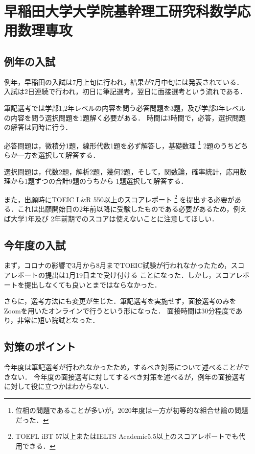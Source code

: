 \documentclass[uplatex]{jsarticle}
\begin{document}
\newpage	
\section*{早稲田大学大学院基幹理工研究科数学応用数理専攻}
\subsection*{例年の入試}
例年，早稲田の入試は7月上旬に行われ，結果が7月中旬には発表されている．
入試は2日連続で行われ，初日に筆記選考，翌日に面接選考という流れである．

筆記選考では学部1,2年レベルの内容を問う必答問題を3題，及び学部3年レベルの内容を問う選択問題を1題解く必要がある．
時間は3時間で，必答，選択問題の解答は同時に行う．

必答問題は，微積分1題，線形代数1題を必ず解答し，基礎数理
\footnote{ 位相の問題であることが多いが，2020年度は一方が初等的な組合せ論の問題だった．}
2題のうちどちらか一方を選択して解答する．

選択問題は，代数2題，解析2題，幾何2題，そして，関数論，確率統計，応用数理から1題ずつの合計9題のうちから
1題選択して解答する．

また，出願時にTOEIC L\&R 550以上のスコアレポート
\footnote{ TOEFL iBT 57以上またはIELTS Academic5.5以上のスコアレポートでも代用できる．}
を提出する必要がある．これは出願開始日の2年前以降に受験したものである必要があるため，例えば大学1年及び
2年前期でのスコアは使えないことに注意してほしい．

\subsection*{今年度の入試}
まず，コロナの影響で3月から8月までTOEIC試験が行われなかったため，スコアレポートの提出は1月19日まで受け付ける
ことになった．しかし，スコアレポートを提出しなくても良いとまではならなかった．

さらに，選考方法にも変更が生じた．筆記選考を実施せず，面接選考のみをZoomを用いたオンラインで行うという形になった．
面接時間は30分程度であり，非常に短い院試となった．


\subsection*{対策のポイント}
今年度は筆記選考が行われなかったため，するべき対策について述べることができない．
今年度の面接選考に対してするべき対策を述べるが，例年の面接選考に対して役に立つかはわからない．
\end{document}
